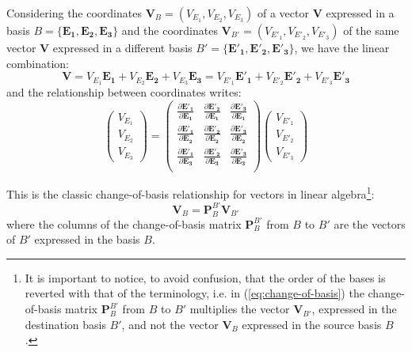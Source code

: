 \documentclass[letterpaper,12pt,oneside]{report}
\begin{document}
Considering the coordinates $\mathbf{V}_B = (V_{E_1},V_{E_2},V_{E_3})$ of a vector $\mathbf{V}$ expressed in a basis $B=\{\mathbf{E_1},\mathbf{E_2},\mathbf{E_3}\}$ and the coordinates $\mathbf{V}_{B'} = (V_{E'_1},V_{E'_2},V_{E'_3})$ of the same vector $\mathbf{V}$ expressed in a different basis $B'=\{\mathbf{E'_1},\mathbf{E'_2},\mathbf{E'_3}\}$, we have the linear combination:
\begin{equation}
\mathbf{V} = V_{E_1}\mathbf{E_1} + V_{E_2}\mathbf{E_2} + V_{E_3}\mathbf{E_3} = V_{E'_1}\mathbf{E'_1} + V_{E'_2}\mathbf{E'_2} + V_{E'_3}\mathbf{E'_3}
\end{equation}
and the relationship between coordinates writes:
\begin{equation}
\left(\begin{array}{c}
V_{E_1} \\ V_{E_2} \\ V_{E_3}
\end{array}\right) =
\left(\begin{array}{ccc}
\frac{\partial \mathbf{E'_1}}{\partial \mathbf{E_1}} & \frac{\partial \mathbf{E'_2}}{\partial \mathbf{E_1}} & \frac{\partial \mathbf{E'_3}}{\partial \mathbf{E_1}} \\
\frac{\partial \mathbf{E'_1}}{\partial \mathbf{E_2}} & \frac{\partial \mathbf{E'_2}}{\partial \mathbf{E_2}} & \frac{\partial \mathbf{E'_3}}{\partial \mathbf{E_2}} \\
\frac{\partial \mathbf{E'_1}}{\partial \mathbf{E_3}} & \frac{\partial \mathbf{E'_2}}{\partial \mathbf{E_3}} & \frac{\partial \mathbf{E'_3}}{\partial \mathbf{E_3}} \\
\end{array}\right)
\left(\begin{array}{c}
V_{E'_1} \\ V_{E'_2} \\ V_{E'_3}
\end{array}\right)
\end{equation}

This is the classic change-of-basis relationship for vectors in linear algebra\footnote{It is important to notice, to avoid confusion, that the order of the bases is reverted with that of the terminology, i.e. in (\ref{eq:change-of-basis}) the change-of-basis matrix $\mathbf{P}_B^{B'}$ from $B$ to $B'$ multiplies the vector $\mathbf{V}_{B'}$, expressed in the destination basis $B'$, and not the vector $\mathbf{V}_B$ expressed in the source basis $B$.}: 
\begin{equation}
\mathbf{V}_B = \mathbf{P}_B^{B'} \mathbf{V}_{B'}
\label{eq:change-of-basis}
\end{equation}
where the columns of the change-of-basis matrix  $\mathbf{P}_B^{B'}$ from $B$ to $B'$ are the vectors of $B'$ expressed in the basis $B$.
\end{document}
